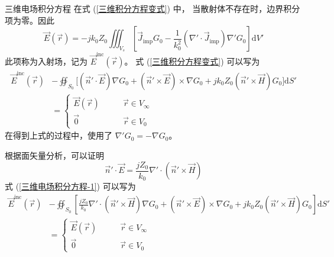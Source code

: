 \begin{theorem}{三维电场积分方程}
    在式 (\ref{三维积分方程变式}) 中，
    当散射体不存在时，边界积分项为零。因此
    \begin{equation}
        \vec{E}(\vec{r}) =
        -jk_0Z_0\iiint_{V_{s}} \left[
            \vec{J}_{\text{imp}} G_0
            -\frac{1}{k_0^2}(\nabla' \cdot \vec{J}_{\text{imp}})
            \nabla' G_0
        \right]\text{d}V'
    \end{equation}
    此项称为入射场，记为 $\vec{E}^{\text{inc}}(\vec{r})$。
    式 (\ref{三维积分方程变式}) 可以写为
    \begin{equation}
        \begin{aligned}
            \vec{E}^{\text{inc}}(\vec{r})
            &-\oiint_{S_0} \Big[
                (\vec{n}'\cdot \vec{E})\nabla G_0
                +(\vec{n}'\times \vec{E})\times\nabla G_0
                +jk_0Z_0(\vec{n}'\times\vec{H})G_0
            \Big]\text{d}S'\\
            &=\left\{
                \begin{aligned}
                    \vec{E}(\vec{r}) \qquad &\vec{r} \in V_{\infty} \\
                    \vec{0} \ \ \ \qquad &\vec{r} \in V_{0}
                \end{aligned}
            \right.
            \label{三维电场积分方程-1}
        \end{aligned}
    \end{equation}
    在得到上式的过程中，使用了
    $\nabla'G_0=-\nabla G_0$。

    根据面矢量分析，可以证明
    \begin{equation}
        \vec{n}'\cdot\vec{E}
        =\frac{jZ_0}{k_0}\nabla'\cdot(\vec{n}'\times\vec{H})
    \end{equation}
    式 (\ref{三维电场积分方程-1}) 可以写为
    \begin{equation}
        \begin{aligned}
            \vec{E}^{\text{inc}}(\vec{r})
            &-\oiint_{S_0} \left[
                \frac{jZ_0}{k_0}\nabla'\cdot(\vec{n}'\times\vec{H})\nabla G_0
                +(\vec{n}'\times \vec{E})\times\nabla G_0
                +jk_0Z_0(\vec{n}'\times\vec{H})G_0
            \right]\text{d}S'\\
            &=\left\{
                \begin{aligned}
                    \vec{E}(\vec{r}) \qquad &\vec{r} \in V_{\infty} \\
                    \vec{0} \ \ \ \qquad &\vec{r} \in V_{0}
                \end{aligned}
            \right.
        \end{aligned}
        \label{三维电场积分方程-2}
    \end{equation}
\end{theorem}

